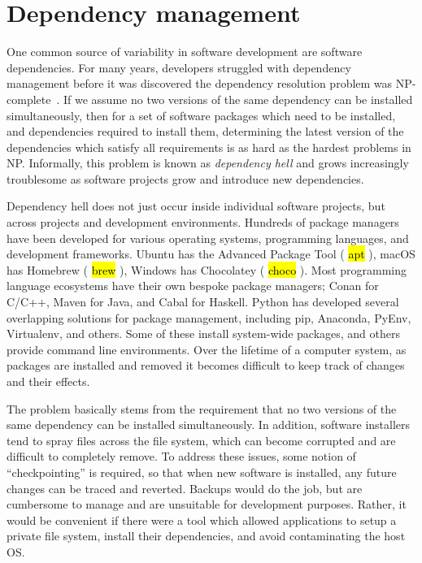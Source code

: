 \documentclass[12pt,initial,twoside,maitrise]{dms}
\newcommand{\inline}[1]{%
\begingroup%
\sethlcolor{slightgray}%
\hl{\ttfamily\small #1}%
\endgroup
}
\numberwithin{equation}{section}
\numberwithin{table}{chapter}
\numberwithin{figure}{chapter}
\begin{document}
\section{Dependency management}\label{sec:dependency-management}

One common source of variability in software development are software dependencies. For many years, developers struggled with dependency management before it was discovered the dependency resolution problem was NP-complete~\citep{abate2012dependency}. If we assume no two versions of the same dependency can be installed simultaneously, then for a set of software packages which need to be installed, and dependencies required to install them, determining the latest version of the dependencies which satisfy all requirements is as hard as the hardest problems in NP. Informally, this problem is known as \textit{dependency hell} and grows increasingly troublesome as software projects grow and introduce new dependencies.

Dependency hell does not just occur inside individual software projects, but across projects and development environments. Hundreds of package managers have been developed for various operating systems, programming languages, and development frameworks. Ubuntu has the Advanced Package Tool (\inline{apt}), macOS has Homebrew (\inline{brew}), Windows has Chocolatey (\inline{choco}). Most programming language ecosystems have their own bespoke package managers; Conan for C/C++, Maven for Java, and Cabal for Haskell. Python has developed several overlapping solutions for package management, including pip, Anaconda, PyEnv, Virtualenv, and others. Some of these install system-wide packages, and others provide command line environments. Over the lifetime of a computer system, as packages are installed and removed it becomes difficult to keep track of changes and their effects.

The problem basically stems from the requirement that no two versions of the same dependency can be installed simultaneously. In addition, software installers tend to spray files across the file system, which can become corrupted and are difficult to completely remove. To address these issues, some notion of ``checkpointing'' is required, so that when new software is installed, any future changes can be traced and reverted. Backups would do the job, but are cumbersome to manage and are unsuitable for development purposes. Rather, it would be convenient if there were a tool which allowed applications to setup a private file system, install their dependencies, and avoid contaminating the host OS.
\end{document}
